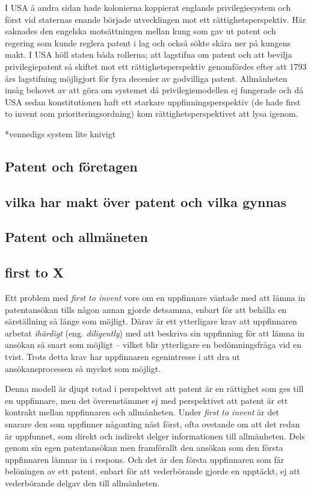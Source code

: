 I USA å andra sidan hade kolonierna koppierat englands privilegiesystem och först vid staternas enande började utvecklingen mot ett rättighetsperspektiv. Här saknades den engelska motsättningen mellan kung som gav ut patent och regering som kunde reglera patent i lag och också sökte skära ner på kungens makt. I USA höll staten båda rollerna; att lagstifna om patent och att bevilja privilegiepatent så skiftet mot ett rättighetsperspektiv genomfördes efter att 1793 års lagstifning möjligjort för fyra decenier av godvilliga patent. Allmänheten insåg behovet av att göra om systemet då privilegiemodellen ej fungerade och då USA sedan konstitutionen haft ett starkare uppfinningsperspektiv (de hade first to invent som prioriteringsordning) kom rättighetsperspektivet att lysa igenom.


*vennedigs system lite knivigt

\subsection{Patent och företagen}

\subsection*{vilka har makt över patent och vilka gynnas}


\subsection*{Patent och allmäneten}


\subsection{first to X}


Ett problem med \emph{first to invent} vore om en uppfinnare väntade med att lämna in patentansökan tills någon annan gjorde detsamma, enbart för att behålla en särställning så länge som möjligt. Därav är ett ytterligare krav att uppfinnaren arbetat \emph{ihärdigt} (eng. \emph{diligently}) med att beskriva sin uppfinning för att lämna in ansökan så snart som möjligt\cite{cmu-overview} -- vilket blir ytterligare en bedömningsfråga vid en tvist\cite{cmu-overview}. Trots detta krav har uppfinnaren egenintresse i att dra ut ansökansprocessen så mycket som möjligt.

Denna modell är djupt rotad i perspektvet att patent är en rättighet som ges till en uppfinnare, men det överenstämmer ej med perspektivet att patent är ett kontrakt mellan uppfinnaren och allmänheten. Under \emph{first to invent} är det snarare den som uppfinner någonting näst först, ofta ovetande om att det redan är uppfunnet, som direkt och indirekt delger informationen till allmänheten. Dels genom sin egen patentansökan men framförallt den ansökan som den första uppfinnaren lämnar in i respons. Och det är den första uppfinnaren som får belöningen av ett patent, enbart för att vederbörande gjorde en upptäckt, ej att vederbörande delgav den till allmänheten.

